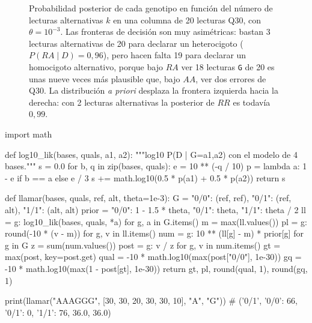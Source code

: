 \begin{figure}[t]
\centering
{}
\caption[Posterior del genotipo según la fracción alélica]{Probabilidad posterior de cada genotipo en función del número de lecturas alternativas $k$ en una columna de 20 lecturas Q30, con $\theta=10^{-3}$. Las fronteras de decisión son muy asimétricas: bastan 3 lecturas alternativas de 20 para declarar un heterocigoto ($P(RA\mid D)=0{,}96$), pero hacen falta 19 para declarar un homocigoto alternativo, porque bajo $RA$ ver 18 lecturas \texttt{G} de 20 es unas nueve veces más plausible que, bajo $AA$, ver dos errores de Q30. La distribución \emph{a priori} desplaza la frontera izquierda hacia la derecha: con 2 lecturas alternativas la posterior de $RR$ es todavía $0{,}99$.}
\label{fig:09-post-k}
\end{figure}

\begin{codigo}[genotipos.py]
import math

def log10_lik(bases, quals, a1, a2):
    """log10 P(D | G={a1,a2}) con el modelo de 4 bases."""
    s = 0.0
    for b, q in zip(bases, quals):
        e = 10 ** (-q / 10)
        p = lambda a: 1 - e if b == a else e / 3
        s += math.log10(0.5 * p(a1) + 0.5 * p(a2))
    return s

def llamar(bases, quals, ref, alt, theta=1e-3):
    G = {"0/0": (ref, ref), "0/1": (ref, alt), "1/1": (alt, alt)}
    prior = {"0/0": 1 - 1.5 * theta, "0/1": theta, "1/1": theta / 2}
    ll = {g: log10_lik(bases, quals, *a) for g, a in G.items()}
    m = max(ll.values())
    pl = {g: round(-10 * (v - m)) for g, v in ll.items()}
    num = {g: 10 ** (ll[g] - m) * prior[g] for g in G}
    z = sum(num.values())
    post = {g: v / z for g, v in num.items()}
    gt = max(post, key=post.get)
    qual = -10 * math.log10(max(post["0/0"], 1e-30))
    gq = -10 * math.log10(max(1 - post[gt], 1e-30))
    return gt, pl, round(qual, 1), round(gq, 1)

print(llamar("AAAGGG", [30, 30, 20, 30, 30, 10], "A", "G"))
# ('0/1', {'0/0': 66, '0/1': 0, '1/1': 76}, 36.0, 36.0)
\end{codigo}

